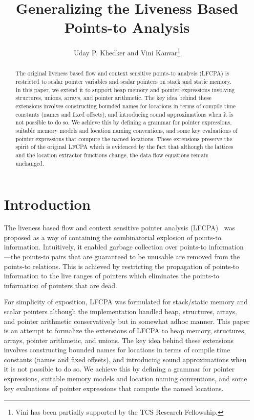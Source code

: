 \documentclass[a4paper,11pt,fleqn]{article}
\begin{document}
\date{}

\title{\textbf{Generalizing the Liveness Based Points-to Analysis}}
\author{{\Large Uday P. Khedker} and {\Large Vini Kanvar}\thanks{Vini has been partially supported by the TCS Research Fellowship.}}
\titledate
\maketitle
\thispagestyle{empty}

\begin{abstract}
The original liveness based flow and context sensitive points-to
analysis (LFCPA) is restricted to scalar pointer variables and scalar
pointees on stack and static memory. In this paper, we extend it to
support heap memory and pointer expressions involving structures, unions,
arrays, and pointer arithmetic. The key idea behind these extensions
involves constructing bounded names for locations in terms of compile
time constants (names and fixed offsets), and introducing sound
approximations when it is not possible to do so. We achieve this by
defining a grammar for pointer expressions, suitable memory models
and location naming conventions, and some key evaluations of pointer
expressions that compute the named locations. These extensions preserve
the spirit of the original LFCPA which is evidenced by the fact that
although the lattices and the location extractor functions change, the 
data flow equations remain unchanged.
\end{abstract}


\section{Introduction}
The liveness based flow and context sensitive pointer analysis
(LFCPA)~\cite{lfcpa} was proposed as a way of containing the
combinatorial explosion of points-to information. Intuitively, it
enabled garbage collection over points-to information---the points-to
pairs that are guaranteed to be unusable 
are removed from the points-to relations. 
This is achieved by restricting the propagation of
points-to information to the live ranges of pointers which 
eliminates the points-to information of pointers that are dead. 

For simplicity of exposition, LFCPA was formulated for stack/static
memory and scalar pointers although the implementation handled
heap, structures, arrays, and pointer arithmetic conservatively but
in somewhat adhoc manner. This paper is an attempt to formalize
the extensions of LFCPA to heap memory, structures, arrays, 
pointer arithmetic, and unions. 
The key idea behind these extensions
involves constructing bounded names for locations in terms of compile
time constants (names and fixed offsets), and introducing sound
approximations when it is not possible to do so. 
We achieve this by
defining a grammar for pointer expressions, suitable memory models
and location naming conventions, and some key evaluations of pointer
expressions that compute the named locations. 
\end{document}
